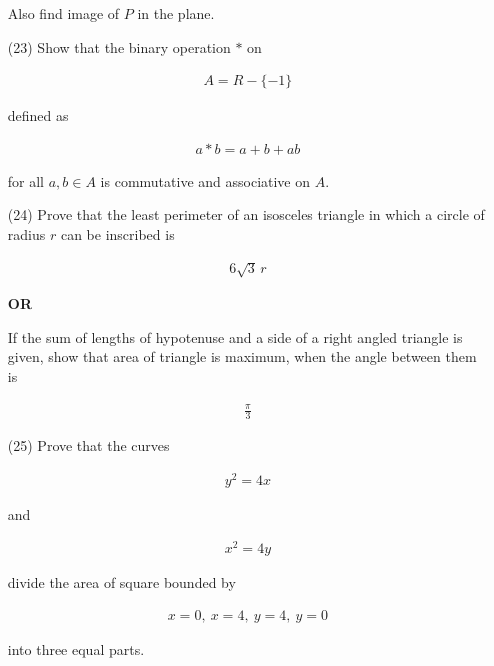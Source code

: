 \documentclass[12pt]{article}
\begin{document}
\begin{enumerate}
Also find image of $P$ in the plane.

\vspace{0.2cm}

\item[(23)] Show that the binary operation $*$ on

\begin{align*}
A=R-\{-1\}
\end{align*}

defined as

\begin{align*}
a*b=a+b+ab
\end{align*}

for all $a,b\in A$ is commutative and associative on $A$.

\vspace{0.2cm}

\item[(24)] Prove that the least perimeter of an isosceles triangle in which a circle of radius $r$ can be inscribed is

\begin{align*}
6\sqrt{3}\,r
\end{align*}

\textbf{OR}

If the sum of lengths of hypotenuse and a side of a right angled triangle is given, show that area of triangle is maximum, when the angle between them is

\begin{align*}
\frac{\pi}{3}
\end{align*}

\vspace{0.2cm}

\item[(25)] Prove that the curves

\begin{align*}
y^2=4x
\end{align*}

and

\begin{align*}
x^2=4y
\end{align*}

divide the area of square bounded by

\begin{align*}
x=0,\ x=4,\ y=4,\ y=0
\end{align*}

into three equal parts.

\vspace{0.2cm}


\end{enumerate}
\end{document}
